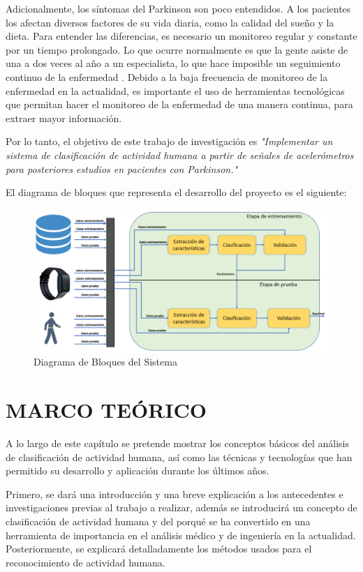 \documentclass[11pt]{report}
\begin{document}
\justify
\par
\medskip
\noindent
Adicionalmente, los síntomas del Parkinson son poco entendidos. A los pacientes los afectan diversos factores de su vida diaria, como la calidad del sueño y la dieta. Para entender las diferencias, es necesario un monitoreo regular y constante por un tiempo prolongado. Lo que ocurre normalmente es que la gente asiste de una a dos veces al año a un especialista, lo que hace imposible un seguimiento continuo de la enfermedad \cite{elcomercio}. Debido a la baja frecuencia de monitoreo de la enfermedad en la actualidad, es importante el uso de herramientas tecnológicas que permitan hacer el monitoreo de la enfermedad de una manera continua, para extraer mayor información.


\justify
\par
\medskip
\noindent
Por lo tanto, el objetivo de este trabajo de investigación es \textit{"Implementar un sistema de clasificación de actividad humana a partir de señales de acelerómetros para posteriores estudios en pacientes con Parkinson."}

\justify
\par
\medskip
\noindent
El diagrama de bloques que representa el desarrollo del proyecto es el siguiente:
\begin{figure}[h]
  \centering
    \includegraphics[width=1\textwidth]{diagrama}
   \caption{Diagrama de Bloques del Sistema}
\end{figure}

\chapter{MARCO TEÓRICO}
A lo largo de este capítulo se pretende mostrar los conceptos básicos del análisis de clasificación de actividad humana,
así como las técnicas y tecnologías que han permitido su desarrollo y aplicación durante los últimos años.
\par
\medskip
\noindent
Primero, se dará una introducción y una breve explicación a los antecedentes e investigaciones previas al trabajo a realizar, además se introducirá un concepto de clasificación de actividad humana y del porqué se ha convertido en una herramienta
de importancia en el análisis médico y de ingeniería en la actualidad. Posteriormente, se explicará detalladamente los métodos usados para el reconocimiento de actividad humana.
\end{document}
